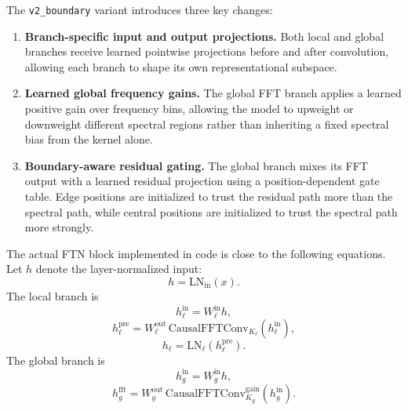 \documentclass[11pt]{article}
\begin{document}
The \texttt{v2\_boundary} variant introduces three key changes:
\begin{enumerate}[leftmargin=1.5em]
    \item \textbf{Branch-specific input and output projections.} Both local and global branches receive learned pointwise projections before and after convolution, allowing each branch to shape its own representational subspace.
    \item \textbf{Learned global frequency gains.} The global FFT branch applies a learned positive gain over frequency bins, allowing the model to upweight or downweight different spectral regions rather than inheriting a fixed spectral bias from the kernel alone.
    \item \textbf{Boundary-aware residual gating.} The global branch mixes its FFT output with a learned residual projection using a position-dependent gate table. Edge positions are initialized to trust the residual path more than the spectral path, while central positions are initialized to trust the spectral path more strongly.
\end{enumerate}

The actual FTN block implemented in code is close to the following equations. Let $h$ denote the layer-normalized input:
\begin{equation}
    h = \mathrm{LN}_{\mathrm{in}}(x).
\end{equation}
The local branch is
\begin{equation}
    h_{\ell}^{\mathrm{in}} = W_{\ell}^{\mathrm{in}} h,
\end{equation}
\begin{equation}
    h_{\ell}^{\mathrm{pre}} = W_{\ell}^{\mathrm{out}} \, \mathrm{CausalFFTConv}_{K_{\ell}}(h_{\ell}^{\mathrm{in}}),
\end{equation}
\begin{equation}
    h_{\ell} = \mathrm{LN}_{\ell}(h_{\ell}^{\mathrm{pre}}).
\end{equation}
The global branch is
\begin{equation}
    h_{g}^{\mathrm{in}} = W_{g}^{\mathrm{in}} h,
\end{equation}
\begin{equation}
    h_{g}^{\mathrm{fft}} = W_{g}^{\mathrm{out}} \, \mathrm{CausalFFTConv}_{K_g}^{\mathrm{gain}}(h_{g}^{\mathrm{in}}).
\end{equation}
\end{document}
